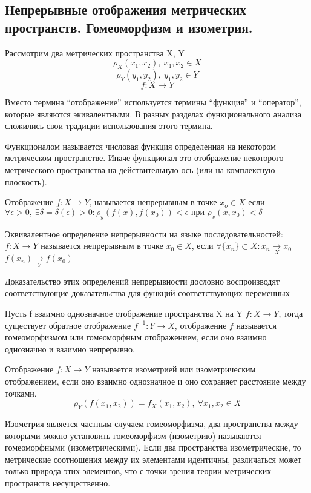 \documentclass[14pt,a4paper]{extarticle}
\theoremstyle{definition}
\theoremstyle{remark}
\renewcommand{\[}{\begin{dmath*}[compact]}
\renewcommand{\]}{\end{dmath*}}
\newcommand{\sep}{ , \ \allowbreak }
\begin{document}
\subsection{Непрерывные отображения метрических пространств.
Гомеоморфизм и изометрия.}

Рассмотрим два метрических пространства X, Y
\[\rho_X(x_1,x_2)\sep x_1,x_2\in X \]
\[\rho_Y(y_1, y_2)\sep y_1,y_2\in Y \]
\[ {f: X \to Y}\]

Вместо термина ``отображение'' используется термины ``функция'' и
``оператор'', которые являются экивалентными.
В разных разделах функционального анализа сложились свои традиции
использования этого термина.

Функционалом называется числовая функция определенная на некотором метрическом
пространстве. Иначе функционал это отображение некоторого метрического
пространства на действительную ось (или на комплексную плоскость).

Отображение $f: X \to Y$, называется непрерывным в точке $x_o \in X$ если
$ \forall \epsilon > 0 \sep \exists \delta = \delta (\epsilon) > 0:
\rho_y(f(x), f(x_0)) < \epsilon \text{ при } \rho_x(x,x_0)<\delta $

Эквивалентное определение непрерывности на языке последовательностей:
$f: X \to Y$ называется непрерывным в точке $x_0 \in X$, если
$\forall \{x_n\}\subset X: x_n\xrightarrow[X]{} x_0$
$f(x_n) \xrightarrow[Y]{} f(x_0)$

Доказательство этих определений непрерывности дословно воспроизводят
соответствующие доказательства для функций соответствующих переменных

Пусть f взаимно однозначное отображение пространства X на Y
$f: X \to Y$, тогда существует обратное отображение
$f^{-1}: Y\to X$, отображение $f$ называется гомеоморфизмом или гомеоморфным
отображением, если оно взаимно однозначно и взаимно непрерывно.

Отображение $f: X \to Y$ называется изометрией или изометрическим
отображением, если оно взаимно однозначное и оно сохраняет расстояние между
точками.
\[ \rho_Y(f(x_1,x_2))=f_X(x_1,x_2) \sep {\forall x_1,x_2\in X}\]

Изометрия является частным случаем гомеоморфизма, два пространства между
которыми можно установить гомеоморфизм (изометрию) называются гомеоморфными
(изометрическими). Если два пространства изометрические, то метрические
соотношения между их элементами идентичны, различаться может только природа
этих элементов, что с точки зрения теории метрических пространств несущественно.
\end{document}
